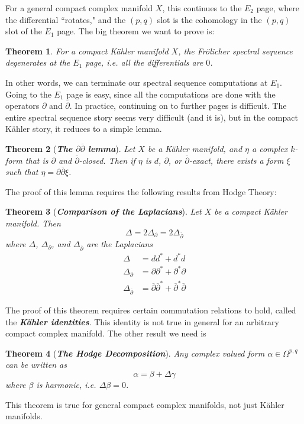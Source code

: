 \documentclass[psamsfonts, 12pt]{amsart}
\newtheorem{thm}{Theorem}[section]
\theoremstyle{definition}
\theoremstyle{remark}
\newcommand{\ib}[1]{\textbf{\textit{#1}}}
\newcommand{\dbar}{\overline{\partial}}
\begin{document}
\begin{center}
\printpage[name=Frolicher1, page = 1]
\end{center}
%
For a general compact complex manifold $X$, this continues to the $E_2$ page,
where the differential ``rotates," and the $(p,q)$ slot is the cohomology in
the $(p,q)$ slot of the $E_1$ page. The big theorem we want to prove is:
%
\begin{thm}
For a compact K\"ahler manifold $X$, the Fr\"olicher spectral sequence degenerates at
the $E_1$ page, i.e. all the differentials are $0$.
\end{thm}
%
In other words, we can terminate our spectral sequence computations at $E_1$.
Going to the $E_1$ page is easy, since all the computations are done with the
operators $\partial$ and $\dbar$. In practice, continuing on to further pages
is difficult. The entire spectral sequence story seems very difficult (and it is),
but in the compact K\"ahler story, it reduces to a simple lemma.
%
\begin{thm}[\ib{The $\partial\dbar$ lemma}]
Let $X$ be a K\"ahler manifold, and $\eta$ a complex $k$-form that is $\partial$
and $\dbar$-closed. Then if $\eta$ is $d$, $\partial$, or $\dbar$-exact, there exists
a form $\xi$ such that $\eta = \partial\dbar\xi$.
\end{thm}
%
The proof of this lemma requires the following results from Hodge Theory:
%
\begin{thm}[\ib{Comparison of the Laplacians}]
Let $X$ be a compact K\"ahler manifold. Then
\[
\Delta = 2\Delta_\partial = 2\Delta_{\dbar}
\]
where $\Delta$, $\Delta_\partial$, and $\Delta_{\dbar}$ are the Laplacians
\begin{align*}
\Delta &= dd^* + d^*d \\
\Delta_\partial &= \partial\partial^* + \partial^*\partial \\
\Delta_{\dbar} &= \dbar\dbar^* + \dbar^*\dbar
\end{align*}
\end{thm}
%
The proof of this theorem requires certain commutation relations to hold, called
the \ib{K\"ahler identities}. This identity is not true in general for an
arbitrary compact complex manifold. The other result we need is
%
\begin{thm}[\ib{The Hodge Decomposition}]
Any complex valued form $\alpha \in \Omega^{p,q}$ can be written as
\[
\alpha = \beta + \Delta\gamma
\]
where $\beta$ is harmonic, i.e. $\Delta\beta = 0$.
\end{thm}
%
This theorem is true for general compact complex manifolds, not just K\"ahler manifolds.
\end{document}
